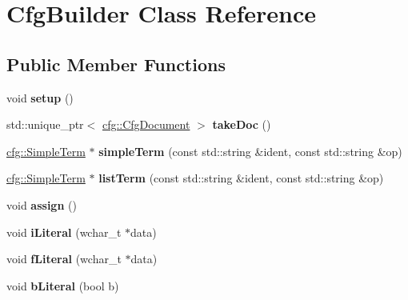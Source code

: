 \hypertarget{classCfgBuilder}{\section{Cfg\-Builder Class Reference}
\label{classCfgBuilder}
}
\subsection*{Public Member Functions}
\begin{DoxyCompactItemize}
\item 
\hypertarget{classCfgBuilder_a5af2d2e469dbe4c403727f27bcad6ba3}{void {\bfseries setup} ()}\label{classCfgBuilder_a5af2d2e469dbe4c403727f27bcad6ba3}

\item 
\hypertarget{classCfgBuilder_afd5db277b02899116fb115e23a2ffd50}{std\-::unique\-\_\-ptr$<$ \hyperlink{classcfg_1_1CfgDocument}{cfg\-::\-Cfg\-Document} $>$ {\bfseries take\-Doc} ()}\label{classCfgBuilder_afd5db277b02899116fb115e23a2ffd50}

\item 
\hypertarget{classCfgBuilder_ac105e810c5cf5c7f8a053614f3f2987a}{\hyperlink{classcfg_1_1SimpleTerm}{cfg\-::\-Simple\-Term} $\ast$ {\bfseries simple\-Term} (const std\-::string \&ident, const std\-::string \&op)}\label{classCfgBuilder_ac105e810c5cf5c7f8a053614f3f2987a}

\item 
\hypertarget{classCfgBuilder_acb5a4d224b4a0dbc23d8bdde4fbf3312}{\hyperlink{classcfg_1_1SimpleTerm}{cfg\-::\-Simple\-Term} $\ast$ {\bfseries list\-Term} (const std\-::string \&ident, const std\-::string \&op)}\label{classCfgBuilder_acb5a4d224b4a0dbc23d8bdde4fbf3312}

\item 
\hypertarget{classCfgBuilder_aa8c4e0c4b955a6ada763bafce754d3a2}{void {\bfseries assign} ()}\label{classCfgBuilder_aa8c4e0c4b955a6ada763bafce754d3a2}

\item 
\hypertarget{classCfgBuilder_af74e188fb692e1895b36ec09bd9a1afe}{void {\bfseries i\-Literal} (wchar\-\_\-t $\ast$data)}\label{classCfgBuilder_af74e188fb692e1895b36ec09bd9a1afe}

\item 
\hypertarget{classCfgBuilder_a59e3ae228a32d5d04f929f032c9cdd42}{void {\bfseries f\-Literal} (wchar\-\_\-t $\ast$data)}\label{classCfgBuilder_a59e3ae228a32d5d04f929f032c9cdd42}

\item 
\hypertarget{classCfgBuilder_a1e908f4837c367f05385dd63e38d3e4c}{void {\bfseries b\-Literal} (bool b)}\label{classCfgBuilder_a1e908f4837c367f05385dd63e38d3e4c}


\end{DoxyCompactItemize}

